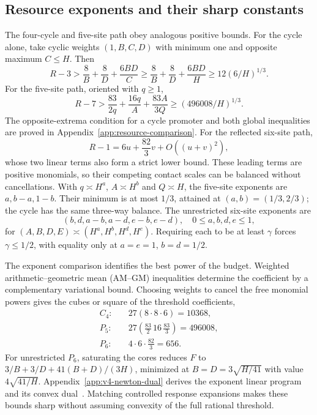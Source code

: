 \documentclass[aps,pre,reprint,amsmath,amssymb,longbibliography]{revtex4-2}
\begin{document}
\subsection{Resource exponents and their sharp constants}
\label{sec:cost-comparison}
The four-cycle and five-site path obey analogous positive bounds.
For the cycle alone, take cyclic weights $(1,B,C,D)$ with minimum one
and opposite maximum $C\le H$. Then
\begin{equation}
 R-3>\frac8B+\frac8D+\frac{6BD}{C}\ge\frac8B+\frac8D+\frac{6BD}{H}
          \ge12(6/H)^{1/3}.
 \label{eq:c4-cost}
\end{equation}
For the five-site path, oriented with $q\ge1$,
\begin{equation}
 R-7>\frac{83}{2q}+\frac{16q}{A}+\frac{83A}{3Q}
       \ge(496008/H)^{1/3}.
 \label{eq:p5-cost}
\end{equation}
The opposite-extrema condition for a cycle promoter and both global
inequalities are proved in Appendix~\ref{app:resource-comparison}.
For the reflected six-site path,
\begin{equation}
 R-1=6u+\frac{82}{3}v+O((u+v)^2),
 \label{eq:p6-expansion}
\end{equation}
whose two linear terms also form a strict lower bound. These leading terms are positive monomials, so their competing
contact scales can be balanced without cancellations. With $q\asymp H^a$, $A\asymp H^b$ and
$Q\asymp H$, the five-site exponents are $a,b-a,1-b$. Their minimum
is at most $1/3$, attained at $(a,b)=(1/3,2/3)$; the cycle has the
same three-way balance. The unrestricted six-site exponents are
\begin{equation}
 (b,d,a-b,a-d,e-b,e-d),\quad 0\le a,b,d,e\le1,
 \label{eq:v4-six-exponents}
\end{equation}
for $(A,B,D,E)\asymp(H^a,H^b,H^d,H^e)$. Requiring each to be at least
$\gamma$ forces $\gamma\le1/2$, with equality only at
$a=e=1$, $b=d=1/2$.

The exponent comparison identifies the best power of the budget.
Weighted arithmetic--geometric mean (AM--GM) inequalities determine
the coefficient by a complementary variational bound. Choosing weights to cancel the free monomial powers gives
the cubes or square of the threshold coefficients,
\begin{equation}
 \begin{aligned}
 C_4:&\quad 27(8\cdot8\cdot6)=10368,\\
 P_5:&\quad 27\left(\frac{83}{2}\,16\,\frac{83}{3}\right)=496008,\\
 P_6:&\quad 4\cdot6\cdot\frac{82}{3}=656.
 \end{aligned}
 \label{eq:v4-dual-constants}
\end{equation}
For unrestricted $P_6$, saturating the cores reduces $F$ to
$3/B+3/D+41(B+D)/(3H)$, minimized at
$B=D=3\sqrt{H/41}$ with value $4\sqrt{41/H}$.
Appendix~\ref{app:v4-newton-dual} derives the exponent linear program
and its convex dual~\cite{MathBoydGP2007}. Matching controlled response
expansions makes these bounds sharp without assuming convexity of the
full rational threshold.
\end{document}
